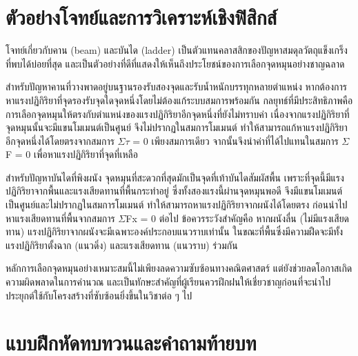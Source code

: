 \section{ตัวอย่างโจทย์และการวิเคราะห์เชิงฟิสิกส์}

\begin{examplebox}
โจทย์เกี่ยวกับคาน (beam) และบันได (ladder) เป็นตัวแทนคลาสสิกของปัญหาสมดุลวัตถุแข็งเกร็งที่พบได้บ่อยที่สุด และเป็นตัวอย่างที่ดีที่แสดงให้เห็นถึงประโยชน์ของการเลือกจุดหมุนอย่างชาญฉลาด

สำหรับปัญหาคานที่วางพาดอยู่บนฐานรองรับสองจุดและรับน้ำหนักบรรทุกหลายตำแหน่ง หากต้องการหาแรงปฏิกิริยาที่จุดรองรับจุดใดจุดหนึ่งโดยไม่ต้องแก้ระบบสมการพร้อมกัน กลยุทธ์ที่มีประสิทธิภาพคือการเลือกจุดหมุนให้ตรงกับตำแหน่งของแรงปฏิกิริยาอีกจุดหนึ่งที่ยังไม่ทราบค่า เนื่องจากแรงปฏิกิริยาที่จุดหมุนนั้นจะมีแขนโมเมนต์เป็นศูนย์ จึงไม่ปรากฏในสมการโมเมนต์ ทำให้สามารถแก้หาแรงปฏิกิริยาอีกจุดหนึ่งได้โดยตรงจากสมการ $\Sigma$$\tau$ = 0 เพียงสมการเดียว จากนั้นจึงนำค่าที่ได้ไปแทนในสมการ $\Sigma$F = 0 เพื่อหาแรงปฏิกิริยาที่จุดที่เหลือ

สำหรับปัญหาบันไดที่พิงผนัง จุดหมุนที่สะดวกที่สุดมักเป็นจุดที่เท้าบันไดสัมผัสพื้น เพราะที่จุดนี้มีแรงปฏิกิริยาจากพื้นและแรงเสียดทานที่พื้นกระทำอยู่ ซึ่งทั้งสองแรงนี้ผ่านจุดหมุนพอดี จึงมีแขนโมเมนต์เป็นศูนย์และไม่ปรากฏในสมการโมเมนต์ ทำให้สามารถหาแรงปฏิกิริยาจากผนังได้โดยตรง ก่อนนำไปหาแรงเสียดทานที่พื้นจากสมการ $\Sigma$Fx = 0 ต่อไป ข้อควรระวังสำคัญคือ หากผนังลื่น (ไม่มีแรงเสียดทาน) แรงปฏิกิริยาจากผนังจะมีเฉพาะองค์ประกอบแนวราบเท่านั้น ในขณะที่พื้นซึ่งมีความฝืดจะมีทั้งแรงปฏิกิริยาตั้งฉาก (แนวดิ่ง) และแรงเสียดทาน (แนวราบ) ร่วมกัน

หลักการเลือกจุดหมุนอย่างเหมาะสมนี้ไม่เพียงลดความซับซ้อนทางคณิตศาสตร์ แต่ยังช่วยลดโอกาสเกิดความผิดพลาดในการคำนวณ และเป็นทักษะสำคัญที่ผู้เรียนควรฝึกฝนให้เชี่ยวชาญก่อนที่จะนำไปประยุกต์ใช้กับโครงสร้างที่ซับซ้อนยิ่งขึ้นในวิชาต่อ ๆ ไป
\end{examplebox}

\section{แบบฝึกหัดทบทวนและคำถามท้ายบท}

